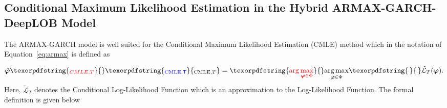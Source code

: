 \documentclass[10pt,a4paper,oneside]{article}
\providecommand{\DIFaddtex}[1]{{\protect\color{blue} \sf #1}} %
\providecommand{\DIFdeltex}[1]{{\protect\color{red} \scriptsize #1}} %
\providecommand{\DIFaddbegin}{} %
\providecommand{\DIFaddend}{} %
\providecommand{\DIFdelbegin}{} %
\providecommand{\DIFdelend}{} %
\providecommand{\DIFadd}[1]{\texorpdfstring{\DIFaddtex{#1}}{#1}} %
\providecommand{\DIFdel}[1]{\texorpdfstring{\DIFdeltex{#1}}{}} %
\newcommand{\DIFscaledelfig}{0.5}
\newlength{\DIFdelgraphicswidth} %
\newlength{\DIFdelgraphicsheight} %
\newcommand{\DIFaddincludegraphics}[2][]{{\color{blue}\fbox{\DIFOincludegraphics[#1]{#2}}}} %
\newcommand{\DIFdelincludegraphics}[2][]{%
\sbox{\DIFdelgraphicsbox}{\DIFOincludegraphics[#1]{#2}}%
\settoboxwidth{\DIFdelgraphicswidth}{\DIFdelgraphicsbox} %
\settoboxtotalheight{\DIFdelgraphicsheight}{\DIFdelgraphicsbox} %
\scalebox{\DIFscaledelfig}{%
\parbox[b]{\DIFdelgraphicswidth}{\usebox{\DIFdelgraphicsbox}\\[-\baselineskip] \rule{\DIFdelgraphicswidth}{0em}}\llap{\resizebox{\DIFdelgraphicswidth}{\DIFdelgraphicsheight}{%
\setlength{\unitlength}{\DIFdelgraphicswidth}%
\begin{picture}(1,1)%
\thicklines\linethickness{2pt} %
{\color[rgb]{1,0,0}\put(0,0){\framebox(1,1){}}}%
{\color[rgb]{1,0,0}\put(0,0){\line( 1,1){1}}}%
{\color[rgb]{1,0,0}\put(0,1){\line(1,-1){1}}}%
\end{picture}%
}\hspace*{3pt}}} %
} %
\DeclareRobustCommand{\DIFaddbegin}{\DIFOaddbegin \let\includegraphics\DIFaddincludegraphics} %
\DeclareRobustCommand{\DIFaddend}{\DIFOaddend \let\includegraphics\DIFOincludegraphics} %
\DeclareRobustCommand{\DIFdelbegin}{\DIFOdelbegin \let\includegraphics\DIFdelincludegraphics} %
\DeclareRobustCommand{\DIFdelend}{\DIFOaddend \let\includegraphics\DIFOincludegraphics} %
\begin{document}
\subsection{Conditional Maximum Likelihood Estimation in the Hybrid ARMAX-GARCH-DeepLOB Model}
\label{subsec:cmle_props_paper}
The ARMAX-GARCH model is well suited for the Conditional Maximum Likelihood Estimation (CMLE) method which in the notation of Equation~\eqref{eq:armax} is defined as

$$
    \hat{\boldsymbol{\varphi}}\DIFdelbegin \DIFdel{_{CMLE, T} }\DIFdelend \DIFaddbegin \DIFadd{_{\mathrm{CMLE}, T} }\DIFaddend = \DIFdelbegin \DIFdel{\arg\max_{\boldsymbol{\varphi} \in \Phi} }%
\DIFdelend \DIFaddbegin \underset{\boldsymbol{\varphi} \in \Phi}{\operatorname{arg\,max}} \DIFadd{\, }\DIFaddend \tilde{\mathcal{L}}_{T}\DIFdelbegin %
\DIFdelend (\boldsymbol{\varphi}).
$$
Here, $\tilde{\mathcal{L}}_{T}$ denotes the Conditional Log-Likelihood Function which is an approximation to the Log-Likelihood Function. The formal definition is given below
\end{document}

